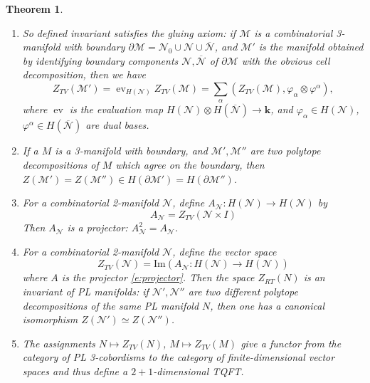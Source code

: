 \documentclass{amsart}
\newtheorem{theorem}{Theorem}[section]
\theoremstyle{definition}
\theoremstyle{remark}
\numberwithin{equation}{section}
\newcommand{\ov}{\overline}
\newcommand{\del}{\partial}
\newcommand{\<}{\langle}
\renewcommand{\>}{\rangle}
\newcommand{\kk}{\mathbf{k}}       %
\newcommand{\N}{\mathcal{N}}       %
\newcommand{\M}{\mathcal{M}}      %
\newcommand{\al}{\alpha}
\newcommand{\ph}{\varphi}
\DeclareMathOperator{\ev}{ev} %
\begin{document}
\begin{theorem}\label{t:main2}
\par\noindent
  \begin{enumerate}
      \item So defined invariant satisfies the gluing axiom: if $\M$ is a
        combinatorial 3-manifold with boundary $\del \M=\N_0\cup
        \N\cup\ov{\N}$, and $\M'$ is the manifold obtained by identifying
        boundary components $\N,\ov{\N}$ of $\del\M$ with the obvious cell
        decomposition, then  we have
    $$
      Z_{TV}(\M')=\ev_{H(\N)}Z_{TV}(\M)=\sum_\al (Z_{TV}(\M),
          \ph_\al\otimes \ph^\al),
    $$
        where $\ev$ is the evaluation map $H(\N)\otimes H(\ov{\N})\to
        \kk$, and $\ph_\al\in H(\N)$,  $\ph^\al\in H(\ov{\N})$ are dual
        bases. 
 
      \item If a $M$ is a 3-manifold with boundary, and $\M', \M''$ are two
        polytope decompositions of $M$  which agree     on the
        boundary, then
        $Z(\M')=Z(\M'')\in H(\del \M')=H(\del \M'')$. 
        
    \item For a combinatorial 2-manifold $\N$, define $A_{\N}\colon H(\N)\to
      H(\N)$ by 
      \begin{equation}\label{e:projector}
       A_{\N}=Z_{TV}(\N\times I)
      \end{equation}
       Then $A_{\N}$ is a projector: $A_{\N}^2=A_{\N}$.
      
      
    \item For a combinatorial 2-manifold $\N$, define the vector space
    \begin{equation}\label{e:modular_functor}
    Z_{TV}(\N)=\mathrm{Im}(A_{\N}\colon H(\N)\to H(\N))
    \end{equation}
  where $A$ is the projector \eqref{e:projector}.
  Then the space $Z_{RT}(N)$ is an invariant of PL manifolds: if $\N',
  \N''$ are two different polytope decompositions of the same PL manifold
  $N$, then one has a canonical isomorphism $Z(\N')\simeq Z(\N'')$.
   
  \item The assignments $N\mapsto Z_{TV}(N)$, $M\mapsto Z_{TV}(M)$ give a
  functor from the category of PL 3-cobordisms to the category of
  finite-dimensional vector spaces and thus define a $2+1$-dimensional
  TQFT.
\end{enumerate}

\end{theorem}
\end{document}
